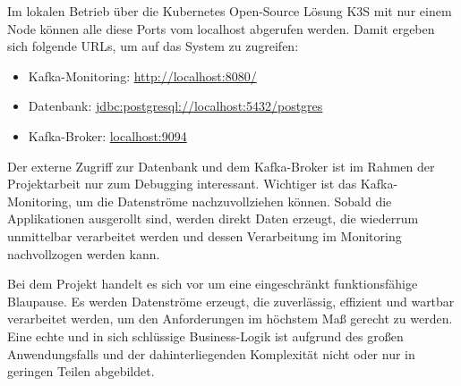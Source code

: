 \documentclass[%
pdftex,
oneside,			%
11pt,				%
parskip=half,		%
headheight = 12pt,	%
headsepline,		%
footsepline,		%
footheight = 16pt,	%
abstracton,		%
DIV=calc,		%
BCOR=8mm,		%
headinclude=false,	%
footinclude=false,	%
listof=totoc,		%
toc=bibliography,	%
]{scrreprt}	%
\begin{document}
    Im lokalen Betrieb über die Kubernetes Open-Source Lösung K3S mit nur einem Node können alle diese Ports vom localhost abgerufen werden.
    Damit ergeben sich folgende URLs, um auf das System zu zugreifen:
    \begin{itemize}
        \item Kafka-Monitoring: \url{http://localhost:8080/}
        \item Datenbank: \url{jdbc:postgresql://localhost:5432/postgres }
        \item Kafka-Broker: \url{localhost:9094}
    \end{itemize}

    Der externe Zugriff zur Datenbank und dem Kafka-Broker ist im Rahmen der Projektarbeit nur zum Debugging interessant.
    Wichtiger ist das Kafka-Monitoring, um die Datenströme nachzuvollziehen können.
    Sobald die Applikationen ausgerollt sind, werden direkt Daten erzeugt, die wiederrum unmittelbar verarbeitet werden und dessen Verarbeitung im Monitoring nachvollzogen werden kann.

    Bei dem Projekt handelt es sich vor um eine eingeschränkt funktionsfähige Blaupause.
    Es werden Datenströme erzeugt, die zuverlässig, effizient und wartbar verarbeitet werden, um den Anforderungen im höchstem Maß gerecht zu werden.
    Eine echte und in sich schlüssige Business-Logik ist aufgrund des großen Anwendungsfalls und der dahinterliegenden Komplexität nicht oder nur in geringen Teilen abgebildet.



\ifx\VAlterZitierstil\VTrueValue
    \printbibliography
\else
    
    
\fi
\end{document}

